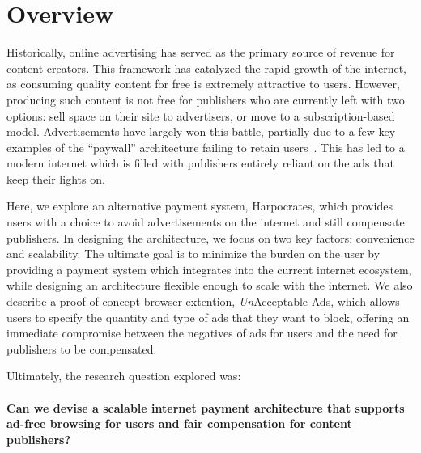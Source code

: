 
\section{Overview}
Historically, online advertising has served as the primary source of revenue for content creators.
This framework has catalyzed the rapid growth of the internet, as consuming quality content for free is extremely attractive to users.
However, producing such content is not free for publishers who are currently left with two options: sell space on their site to advertisers, or move to a subscription-based model.
Advertisements have largely won this battle, partially due to a few key examples of the “paywall” architecture failing to retain users~\cite{nyt}.
This has led to a modern internet which is filled with publishers entirely reliant on the ads that keep their lights on.

Here, we explore an alternative payment system, Harpocrates, which provides users with a choice to avoid advertisements on the internet and still compensate publishers.
In designing the architecture, we focus on two key factors: convenience and scalability.
The ultimate goal is to minimize the burden on the user by providing a payment system which integrates into the current internet ecosystem, while designing an architecture flexible enough to scale with the internet.
We also describe a proof of concept browser extention, \textit{Un}Acceptable Ads, which allows users to specify the quantity and type of ads that they want to block, offering an immediate compromise between the negatives of ads for users and the need for publishers to be compensated.

Ultimately, the research question explored was: \\
\\
\textbf{Can we devise a scalable internet payment architecture that supports ad-free browsing for users and fair compensation for content publishers?}
